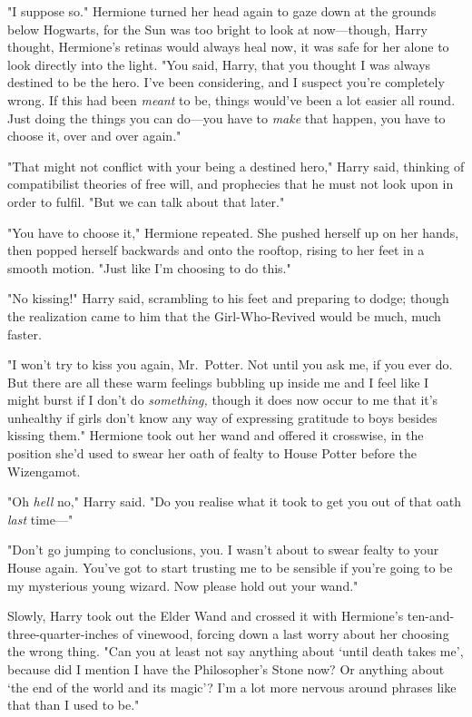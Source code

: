 "I suppose so." Hermione turned her head again to gaze down at the grounds
below Hogwarts, for the Sun was too bright to look at now---though, Harry
thought, Hermione's retinas would always heal now, it was safe for her alone to
look directly into the light. "You said, Harry, that you thought I was always
destined to be the hero. I've been considering, and I suspect you're completely
wrong. If this had been \emph{meant} to be, things would've been a lot easier
all round. Just doing the things you can do---you have to \emph{make} that
happen, you have to choose it, over and over again."

"That might not conflict with your being a destined hero," Harry said, thinking
of compatibilist theories of free will, and prophecies that he must not look
upon in order to fulfil. "But we can talk about that later."

"You have to choose it," Hermione repeated. She pushed herself up on her hands,
then popped herself backwards and onto the rooftop, rising to her feet in a
smooth motion. "Just like I'm choosing to do this."

"No kissing!" Harry said, scrambling to his feet and preparing to dodge; though
the realization came to him that the Girl-Who-Revived would be much, much
faster.

"I won't try to kiss you again, Mr.~Potter. Not until you ask me, if you ever
do. But there are all these warm feelings bubbling up inside me and I feel like
I might burst if I don't do \emph{something,} though it does now occur to me
that it's unhealthy if girls don't know any way of expressing gratitude to boys
besides kissing them." Hermione took out her wand and offered it crosswise, in
the position she'd used to swear her oath of fealty to House Potter before the
Wizengamot.

"Oh \emph{hell} no," Harry said. "Do you realise what it took to get you out of
that oath \emph{last} time---"

"Don't go jumping to conclusions, you. I wasn't about to swear fealty to your
House again. You've got to start trusting me to be sensible if you're going to
be my mysterious young wizard. Now please hold out your wand."

Slowly, Harry took out the Elder Wand and crossed it with Hermione's
ten-and-three-quarter-inches of vinewood, forcing down a last worry about her
choosing the wrong thing. "Can you at least not say anything about `until death
takes me', because did I mention I have the Philosopher's Stone now? Or
anything about `the end of the world and its magic'? I'm a lot more nervous
around phrases like that than I used to be."

